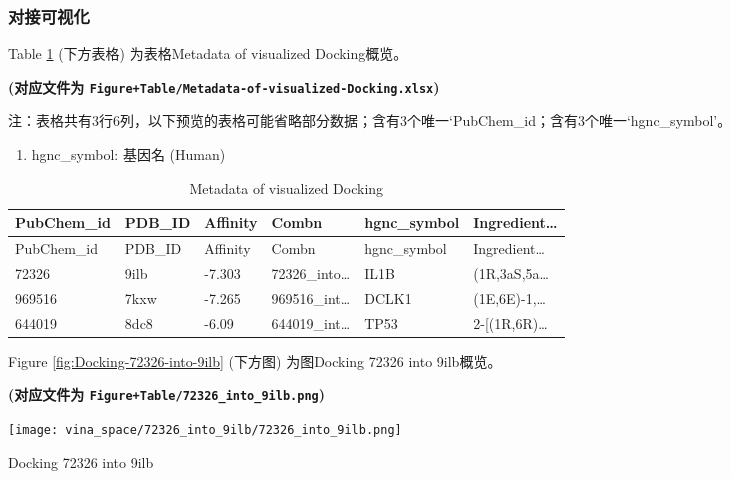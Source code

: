 \documentclass[
]{article}
\providecommand{\tightlist}{%
  \setlength{\itemsep}{0pt}\setlength{\parskip}{0pt}}
\begin{document}
\hypertarget{ux5bf9ux63a5ux53efux89c6ux5316}{%
\subsubsection{对接可视化}\label{ux5bf9ux63a5ux53efux89c6ux5316}}

Table \ref{tab:Metadata-of-visualized-Docking} (下方表格) 为表格Metadata of visualized Docking概览。

\textbf{(对应文件为 \texttt{Figure+Table/Metadata-of-visualized-Docking.xlsx})}

\begin{center}\begin{tcolorbox}[colback=gray!10, colframe=gray!50, width=0.9\linewidth, arc=1mm, boxrule=0.5pt]注：表格共有3行6列，以下预览的表格可能省略部分数据；含有3个唯一`PubChem\_id；含有3个唯一`hgnc\_symbol'。
\end{tcolorbox}
\end{center}
\begin{center}\begin{tcolorbox}[colback=gray!10, colframe=gray!50, width=0.9\linewidth, arc=1mm, boxrule=0.5pt]\begin{enumerate}\tightlist
\item hgnc\_symbol:  基因名 (Human)
\end{enumerate}\end{tcolorbox}
\end{center}

\begin{longtable}[]{@{}llllll@{}}
\caption{\label{tab:Metadata-of-visualized-Docking}Metadata of visualized Docking}\tabularnewline
\toprule
PubChem\_id & PDB\_ID & Affinity & Combn & hgnc\_symbol & Ingredient\ldots{}\tabularnewline
\midrule
\endfirsthead
\toprule
PubChem\_id & PDB\_ID & Affinity & Combn & hgnc\_symbol & Ingredient\ldots{}\tabularnewline
\midrule
\endhead
72326 & 9ilb & -7.303 & 72326\_into\ldots{} & IL1B & (1R,3aS,5a\ldots{}\tabularnewline
969516 & 7kxw & -7.265 & 969516\_int\ldots{} & DCLK1 & (1E,6E)-1,\ldots{}\tabularnewline
644019 & 8dc8 & -6.09 & 644019\_int\ldots{} & TP53 & 2-{[}(1R,6R)\ldots{}\tabularnewline
\bottomrule
\end{longtable}

Figure \ref{fig:Docking-72326-into-9ilb} (下方图) 为图Docking 72326 into 9ilb概览。

\textbf{(对应文件为 \texttt{Figure+Table/72326\_into\_9ilb.png})}

\def\@captype{figure}
\begin{center}
\texttt{[image: vina\_space/72326\_into\_9ilb/72326\_into\_9ilb.png]}
\caption{Docking 72326 into 9ilb}\label{fig:Docking-72326-into-9ilb}
\end{center}
\end{document}
